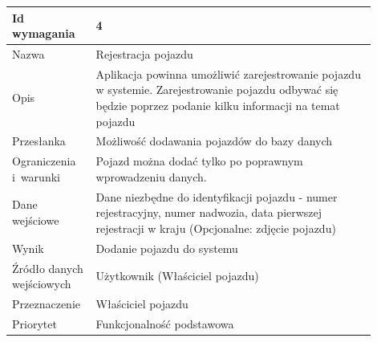 \documentclass[12pt]{article}
\begin{document}
\begin{table}[H]
\begin{center}
	\begin{tabular}{|p{0.18\linewidth}|p{0.72\linewidth}|}%
	\hline
	Id wymagania 	& 4 				\\ \hline
	Nazwa			& Rejestracja pojazdu \\ \hline
	Opis & Aplikacja powinna umożliwić zarejestrowanie pojazdu w systemie. Zarejestrowanie pojazdu odbywać się będzie poprzez podanie kilku informacji na temat pojazdu
\\ \hline
	Przesłanka & Możliwość dodawania pojazdów do bazy danych  \\ \hline
	Ograniczenia i~warunki & Pojazd można dodać tylko po poprawnym wprowadzeniu danych.  \\ \hline
	Dane wejściowe &
Dane niezbędne do identyfikacji pojazdu - numer rejestracyjny, numer nadwozia, data pierwszej rejestracji w kraju
(Opcjonalne: zdjęcie pojazdu)  \\ \hline
	Wynik & Dodanie pojazdu do systemu \\ \hline
	Źródło danych wejściowych & Użytkownik (Właściciel pojazdu) \\ \hline
	Przeznaczenie & Właściciel pojazdu \\ \hline
	Priorytet & Funkcjonalność podstawowa \\ \hline
	\end{tabular}

\end{center}
\end{table}
\end{document}
